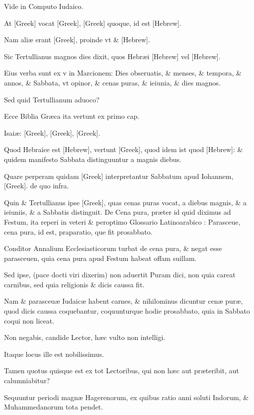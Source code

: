 \begin{parnumbers}
Vide in Computo Iudaico.

At \textgreek{[Greek]} vocat \textgreek{[Greek], [Greek]} quoque, id est \texthebrew{} [Hebrew].

Nam aliæ erant \textgreek{[Greek]}, proinde vt \& \texthebrew{} [Hebrew].

Sic Tertullianus magnos dies dixit, quos Hebræi \texthebrew{} [Hebrew] vel \texthebrew{} [Hebrew].

Eius verba sunt ex v in Marcionem: Dies obseruatis, \& menses, \& tempora, \& annos, \& Sabbata, vt opinor, \& cenas puras, \& ieiunia, \& dies magnos. 

Sed quid Tertullianum aduoco?

Ecce Biblia Græca ita vertunt ex primo cap.

Isaiæ: \textgreek{[Greek], [Greek], [Greek]}.

Quod Hebraice est \texthebrew{} [Hebrew], vertunt \textgreek{[Greek]}, quod idem ist quod \texthebrew{} [Hebrew]: \& quidem manifesto Sabbata distinguuntur a magnis diebus. 

Quare perperam quidam \textgreek{[Greek]} interpretantur Sabbatum apud Iohannem, \textgreek{[Greek]}. de quo infra.

Quin \& Tertullianus ipse \textgreek{[Greek]}, quas cenas puras vocat, a diebus magnis, \& a ieiuniis, \& a Sabbatis distinguit. De Cena pura, præter id quid diximus ad Festum, ita reperi in veteri \& peroptimo Glossario Latinoarabico : Parasceue, cena pura, id est, praparatio, que fit prosabbato.

Conditor Annalium Ecclesiasticorum turbat de cena pura, \& negat esse parasceuen, quia cena pura apud Festum habeat offam suillam.

Sed ipse, (pace docti viri dixerim) non aduertit Puram dici, non quia careat carnibus, sed quia religionis \& dicis caussa fit.

Nam \& parasceuæ Iudaicæ habent carnes, \& nihilominus dicuntur cenæ puræ, quod dicis caussa coquebantur, coquunturque hodie prosabbato, quia in Sabbato coqui non liceat.

Non negabis, candide Lector, hæc vulto non intelligi.

Itaque locus ille est nobilissimus. 

Tamen quotus quisque est ex tot Lectoribus, qui non hæc aut præteribit, aut calumniabitur?

Sequuntur periodi magnæ Hagerenorum, ex quibus ratio anni soluti Indorum, \& Muhammedanorum tota pendet.


\end{parnumbers}
